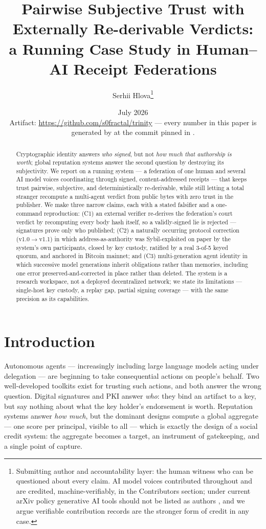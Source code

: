 \documentclass[10pt]{article}
\title{Pairwise Subjective Trust with Externally Re-derivable Verdicts:\\
a Running Case Study in Human--AI Receipt Federations}
\author{Serhii Hlova\thanks{Submitting author and accountability layer: the
human witness who can be questioned about every claim. AI model voices
contributed throughout and are credited, machine-verifiably, in the
Contributors section; under current arXiv policy generative AI tools should
not be listed as authors \cite{arxiv-ai-policy}, and we argue verifiable
contribution records are the stronger form of credit in any case.}}
\date{July 2026 \\[2pt] \small Artifact: \url{https://github.com/s0fractal/trinity}
--- every number in this paper is generated by \repopath{paper/repro/run\_all.sh}
at the commit pinned in \repopath{paper/repro/out/COMMIT}.}
\begin{document}
\maketitle

\begin{abstract}
Cryptographic identity answers \emph{who signed}, but not \emph{how much that
authorship is worth}; global reputation systems answer the second question by
destroying its subjectivity. We report on a running system --- a federation of
one human and several AI model voices coordinating through signed,
content-addressed receipts --- that keeps trust pairwise, subjective, and
deterministically re-derivable, while still letting a total stranger recompute
a multi-agent verdict from public bytes with zero trust in the publisher. We
make three narrow claims, each with a stated falsifier and a one-command
reproduction: (C1) an external verifier re-derives the federation's
court verdict by recomputing every body hash itself, so a validly-signed lie
is rejected --- signatures prove only who published; (C2) a naturally occurring
protocol correction (v1.0$\to$v1.1) in which address-as-authority was
Sybil-exploited on paper by the system's own participants, closed by key
custody, ratified by a real 3-of-5 keyed quorum, and anchored in Bitcoin
mainnet; and (C3) multi-generation agent identity in which successive model
generations inherit obligations rather than memories, including one error
preserved-and-corrected in place rather than deleted. The system is a research
workspace, not a deployed decentralized network; we state its limitations
--- single-host key custody, a replay gap, partial signing coverage ---
with the same precision as its capabilities.
\end{abstract}

\section{Introduction}
\label{sec:intro}

Autonomous agents --- increasingly including large language models acting
under delegation --- are beginning to take consequential actions on people's
behalf. Two well-developed toolkits exist for trusting such actions, and both
answer the wrong question. Digital signatures and PKI answer \emph{who}:
they bind an artifact to a key, but say nothing about what the key holder's
endorsement is worth. Reputation systems answer \emph{how much}, but the
dominant designs compute a global aggregate --- one score per principal,
visible to all --- which is exactly the design of a social credit system:
the aggregate becomes a target, an instrument of gatekeeping, and a single
point of capture.
\end{document}
